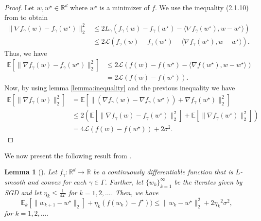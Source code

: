 \documentclass[12pt]{article}
\newtheorem{lemma}[lemma]{Lemma}
\theoremstyle{definition}
\numberwithin{equation}{section}
\newcommand{\R}{\mathbb{R}}
\newcommand{\E}{\mathbb{E}}
\newcommand{\CL}{\mathcal{L}}
\newcommand{\ev}[1]{\mathbb{E}\left[{#1}\right]}
\newcommand{\norm}[1]{\lVert{#1}\rVert_2}
\begin{document}
\begin{proof}
  Let $w, w^\star \in \R^d$ where $w^\star$ is a minimizer of $f$. We use the inequality (2.1.10) from \autocite{nesterovLecturesConvexOptimization2018} to obtain
  \begin{align*}
    \norm{\nabla f_{\gamma}(w) - f_{\gamma}(w^\star)}^2 &\leq 2L_{\gamma}(f_{\gamma}(w) - f_{\gamma}(w^\star) - \langle \nabla f_{\gamma}(w^\star), w - w^\star \rangle) \\
    &\leq 2\CL(f_{\gamma}(w) - f_{\gamma}(w^\star) - \langle \nabla f_{\gamma}(w^\star), w - w^\star \rangle).
  \end{align*}
  Thus, we have
  \begin{align*}
    \ev{\norm{\nabla f_{\gamma}(w) - f_{\gamma}(w^\star)}^2 } &\leq 2\CL(f(w) - f(w^\star) - \langle \nabla f(w^\star), w - w^\star \rangle) \\
    &= 2\CL(f(w) - f(w^\star)).
  \end{align*}
  Now, by using lemma \autoref{lemma:inequality} and the previous inequality we have
  \begin{align*}
    \ev{\norm{\nabla f_{\gamma}(w)}^2} &= \ev{\norm{(\nabla f_{\gamma}(w) - \nabla f_{\gamma}(w^\star)) + \nabla f_{\gamma}(w^\star)}^2} \\
    &\leq 2( \ev{\norm{\nabla f_{\gamma}(w) - f_{\gamma}(w^\star)}^2 } + \ev{\norm{\nabla f_{\gamma}(w^\star)}^2}) \\
    &= 4\CL(f(w) - f(w^\star)) + 2\sigma^2.
  \end{align*}
\end{proof}
We now present the following result from \autocite{sebbouhAlmostSureConvergence2021}.
\begin{lemma}[]
  \label{lemma:sgd_iterates}
  Let $f_{\gamma} : \R^d \rightarrow \R$ be a continuously differentiable function that is $L$-smooth and convex for each $\gamma \in \Gamma$. Further, let $\{w_{k}\}_{k=1}^{\infty}$ be the iterates given by SGD and let $\eta_k \leq \frac{1}{4 \CL}$ for $k=1,2,\dots$. Then, we have
  \begin{equation*}
    \E_k[\norm{w_{k+1} - w^\star}] + \eta_k (f(w_{k}) - f^\star)) \leq \norm{w_{k} - w^\star}^2 + 2{\eta_k}^2\sigma^2,
  \end{equation*}
  for $k=1,2,\dots$.
\end{lemma}
\end{document}
